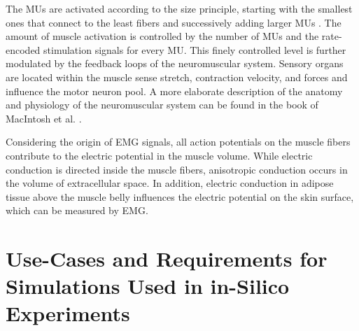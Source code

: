 

The MUs are activated according to the size principle, starting with the smallest ones that connect to the least fibers and successively adding larger MUs \cite{Milner-Brown1973b}. The amount of muscle activation is controlled by the number of MUs and the rate-encoded stimulation signals for every MU. This finely controlled level is further modulated by the feedback loops of the neuromuscular system. Sensory organs are located within the muscle sense stretch, contraction velocity, and forces and influence the motor neuron pool.
A more elaborate description of the anatomy and physiology of the neuromuscular system can be found in the book of MacIntosh et al. \cite{MacIntosh2006}.

Considering the origin of EMG signals, all action potentials on the muscle fibers contribute to the electric potential in the muscle volume. While electric conduction is directed inside the muscle fibers, anisotropic conduction occurs in the volume of extracellular space. In addition, electric conduction in adipose tissue above the muscle belly influences the electric potential on the skin surface, which can be measured by EMG.

\section{ Use-Cases and Requirements for Simulations Used in in-Silico Experiments}\label{sec:challenges_in_silico}

